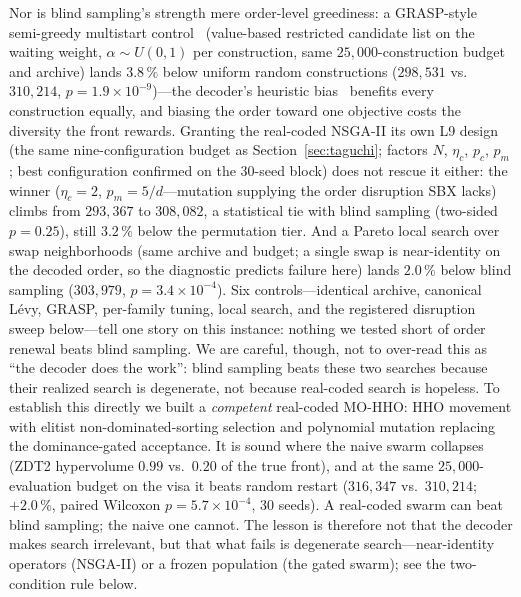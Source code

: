 \documentclass[runningheads]{llncs}
\begin{document}
Nor is blind sampling's strength mere order-level greediness: a GRASP-style semi-greedy multistart control~\cite{feo} (value-based restricted candidate list on the waiting weight, $\alpha\sim U(0,1)$ per construction, same $25{,}000$-construction budget and archive) lands $3.8\,\%$ below uniform random constructions ($298{,}531$ vs.\ $310{,}214$, $p=1.9\times10^{-9}$)---the decoder's heuristic bias~\cite{raidl} benefits every construction equally, and biasing the order toward one objective costs the diversity the front rewards. Granting the real-coded NSGA-II its own L9 design (the same nine-configuration budget as Section~\ref{sec:taguchi}; factors $N$, $\eta_c$, $p_c$, $p_m$; best configuration confirmed on the 30-seed block) does not rescue it either: the winner ($\eta_c{=}2$, $p_m{=}5/d$---mutation supplying the order disruption SBX lacks) climbs from $293{,}367$ to $308{,}082$, a statistical tie with blind sampling (two-sided $p=0.25$), still $3.2\,\%$ below the permutation tier. And a Pareto local search over swap neighborhoods (same archive and budget; a single swap is near-identity on the decoded order, so the diagnostic predicts failure here) lands $2.0\,\%$ below blind sampling ($303{,}979$, $p=3.4\times10^{-4}$). Six controls---identical archive, canonical L\'evy, GRASP, per-family tuning, local search, and the registered disruption sweep below---tell one story on this instance: nothing we tested short of order renewal beats blind sampling. We are careful, though, not to over-read this as ``the decoder does the work'': blind sampling beats these two searches because their realized search is degenerate, not because real-coded search is hopeless. To establish this directly we built a \emph{competent} real-coded MO-HHO: HHO movement with elitist non-dominated-sorting selection and polynomial mutation replacing the dominance-gated acceptance. It is sound where the naive swarm collapses (ZDT2 hypervolume $0.99$ vs.\ $0.20$ of the true front), and at the same $25{,}000$-evaluation budget on the visa it beats random restart ($316{,}347$ vs.\ $310{,}214$; $+2.0\,\%$, paired Wilcoxon $p=5.7\times10^{-4}$, 30 seeds). A real-coded swarm can beat blind sampling; the naive one cannot. The lesson is therefore not that the decoder makes search irrelevant, but that what fails is degenerate search---near-identity operators (NSGA-II) or a frozen population (the gated swarm); see the two-condition rule below.
\end{document}
